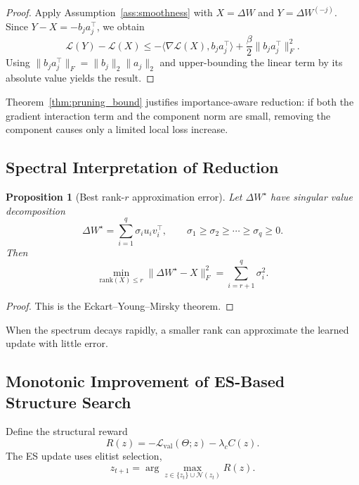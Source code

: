 \documentclass{article}
\newtheorem{proposition}{Proposition}[section]
\begin{document}
\begin{proof}
Apply Assumption~\ref{ass:smoothness} with $X = \Delta W$ and $Y = \Delta W^{(-j)}$. Since $Y-X = -b_j a_j^\top$, we obtain
\begin{equation}
    \mathcal{L}(Y) - \mathcal{L}(X)
    \le
    -\langle \nabla\mathcal{L}(X), b_j a_j^\top \rangle
    + \frac{\beta}{2}\|b_j a_j^\top\|_F^2.
\end{equation}
Using $\|b_j a_j^\top\|_F = \|b_j\|_2\|a_j\|_2$ and upper-bounding the linear term by its absolute value yields the result.
\end{proof}

Theorem~\ref{thm:pruning_bound} justifies importance-aware reduction: if both the gradient interaction term and the component norm are small, removing the component causes only a limited local loss increase.

\subsection{Spectral Interpretation of Reduction}
\begin{proposition}[Best rank-$r$ approximation error]
\label{prop:eckart_young}
Let $\Delta W^\star$ have singular value decomposition
\begin{equation}
    \Delta W^\star = \sum_{i=1}^{q} \sigma_i u_i v_i^\top,
    \qquad \sigma_1 \ge \sigma_2 \ge \cdots \ge \sigma_q \ge 0.
\end{equation}
Then
\begin{equation}
    \min_{\mathrm{rank}(X) \le r} \|\Delta W^\star - X\|_F^2
    = \sum_{i=r+1}^{q} \sigma_i^2.
\end{equation}
\end{proposition}

\begin{proof}
This is the Eckart--Young--Mirsky theorem.
\end{proof}

When the spectrum decays rapidly, a smaller rank can approximate the learned update with little error.

\subsection{Monotonic Improvement of ES-Based Structure Search}
Define the structural reward
\begin{equation}
    R(z) = -\mathcal{L}_{\mathrm{val}}(\Theta; z) - \lambda_c C(z).
\end{equation}
The ES update uses elitist selection,
\begin{equation}
    z_{t+1} = \arg\max_{z \in \{z_t\}\cup\mathcal{N}(z_t)} R(z).
\end{equation}
\end{document}
